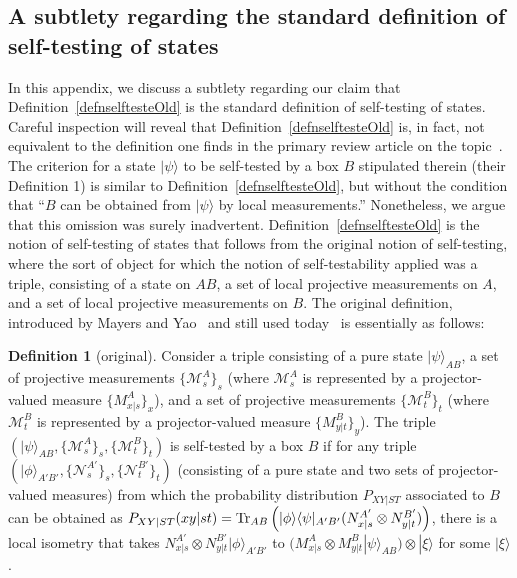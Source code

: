 \documentclass[prx,11pt,letterpaper,twocolumn,accepted=2023-11-27]{quantumarticle}
\theoremstyle{plain}
\theoremstyle{definition}
\newtheorem{defn}{Definition}
\begin{document}
\begin{appendices}
\section{A subtlety regarding the standard definition of self-testing of states}\label{Oversight}

In this appendix, we discuss a subtlety regarding our claim that Definition~\ref{defnselftesteOld} is the standard definition of self-testing of states.  
Careful inspection will reveal that Definition~\ref{defnselftesteOld} is, in fact, not equivalent to the definition one finds in the primary review article on the topic~\cite{vsupic2020self}.  The criterion for a state $|\psi\rangle$ to be self-tested by a box $B$ stipulated therein  (their Definition 1) is similar to Definition~\ref{defnselftesteOld},
  but without the condition that \enquote{$B$ can be obtained from $|\psi\rangle$ by local measurements.} Nonetheless, we argue that this omission 
 was surely inadvertent.  Definition~\ref{defnselftesteOld} is the notion of self-testing of states that follows from the original notion of self-testing, where the sort of object for which the notion of self-testability applied was a triple, consisting of a state on $AB$, a set of local projective measurements on $A$, and a set of local projective measurements on $B$.  
 The original definition, introduced by Mayers and Yao~\cite{mayers1998quantum,mayers2003self} and still used today~\cite{Yang2013selftesting,Wang2016,Bancal2015SelfTesting,Supi2018Mutliselftest} is essentially as follows:

\begin{defn}[original]
\label{defnselftesteOriginal}
Consider a triple  consisting of a pure state $|\psi\rangle_{AB}$, a set of projective measurements $\{ \mathcal{M}^A_s\}_s$ (where $\mathcal{M}^A_s$ is represented by a projector-valued measure $\{M^{A}_{x|s}\}_x$), and a set of projective measurements $\{ \mathcal{M}^B_t\}_t$ (where $\mathcal{M}^B_t$ is represented by a projector-valued measure $\{M^{B}_{y|t}\}_y$). 
 The triple $(|\psi\rangle_{AB}, \{ \mathcal{M}^A_s\}_s, \{\mathcal{M}^B_t\}_t)$ is self-tested by a  box $B$  if for any triple $(|\phi\rangle_{A'B'}, \{ \mathcal{N}^{A'}_s\}_s, \{ \mathcal{N}^{B'}_t\}_t)$ (consisting of a pure state and two sets of projector-valued measures) from which the probability distribution $P_{XY|ST}$ associated to $B$ can be obtained as $P_{XY|ST}(xy|st)= {\rm Tr}_{AB}\left(|\phi\rangle \langle \psi|_{A'B'} (N^{A'}_{x|s} \otimes N^{B'}_{y|t}) \right)$, there is a local isometry  that takes $N^{A'}_{x|s} \otimes N^{B'}_{y|t}|\phi\rangle_{A'B'}$ to $\big( M^{A}_{x|s} \otimes M^{B}_{y|t}|\psi\rangle_{AB} \big) \otimes |\xi\rangle$ for some $|\xi\rangle$.
 \end{defn}
 


\end{appendices}
\end{document}
